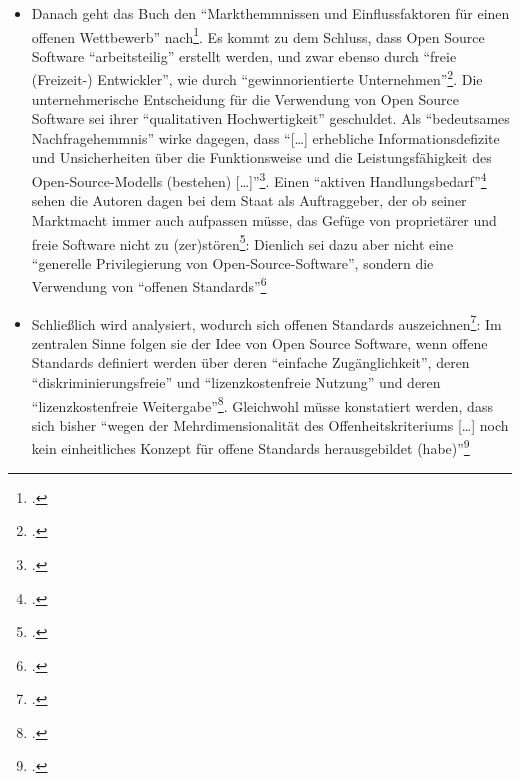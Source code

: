 \documentclass[DIV=calc,BCOR=5mm,11pt,headings=small,oneside,abstract=true, toc=bib]{scrartcl}
\begin{document}
\begin{itemize}
  \item Danach geht das Buch den \enquote{Markthemmnissen und
  Einflussfaktoren für einen offenen Wettbewerb}
  nach\footcite[vgl.][120ff]{Mundhenke2007a}. Es kommt zu dem Schluss, dass Open
  Source Software \enquote{arbeitsteilig} erstellt werden, und zwar
  ebenso durch \enquote{freie (Freizeit-) Entwickler}, wie durch
  \enquote{gewinnorientierte
  Unternehmen}\footcite[vgl.][165]{Mundhenke2007a}. Die unternehmerische
  Entscheidung für die Verwendung von Open Source Software sei ihrer
  \enquote{qualitativen Hochwertigkeit} geschuldet. Als
  \enquote{bedeutsames Nachfragehemmnis} wirke dagegen, dass \enquote{[\ldots]
  erhebliche Informationsdefizite und Unsicherheiten über die
  Funktionsweise und die Leistungsfähigkeit des Open-Source-Modells
  (bestehen) [\ldots]}\footcite[vgl.][165]{Mundhenke2007a}. Einen
  \enquote{aktiven Handlungsbedarf}\footcite[vgl.][165]{Mundhenke2007a}
  sehen die Autoren dagen bei dem Staat als Auftraggeber, der ob seiner
  Marktmacht immer auch aufpassen müsse, das Gefüge von proprietärer und freie
  Software nicht zu (zer)stören\footcite[vgl.][165f]{Mundhenke2007a}: Dienlich
  sei dazu aber nicht eine \enquote{generelle Privilegierung von
  Open-Source-Software}, sondern die Verwendung von \enquote{offenen
  Standards}\footcite[vgl.][166]{Mundhenke2007a}
  \item Schließlich wird analysiert, wodurch sich offenen Standards
  auszeichnen\footcite[vgl.][168ff]{Mundhenke2007a}: Im zentralen Sinne folgen
  sie der Idee von Open Source Software, wenn offene Standards definiert werden
  über deren  \enquote{einfache Zugänglichkeit}, deren
  \enquote{diskriminierungsfreie} und \enquote{lizenzkostenfreie
  Nutzung} und deren \enquote{lizenzkostenfreie
  Weitergabe}\footcite[vgl.][175]{Mundhenke2007a}. Gleichwohl müsse
  konstatiert werden, dass sich bisher \enquote{wegen der
  Mehrdimensionalität des Offenheitskriteriums [\ldots] noch kein
  einheitliches Konzept für offene Standards herausgebildet
  (habe)}\footcite[vgl.][189]{Mundhenke2007a}
\end{itemize}
\end{document}
